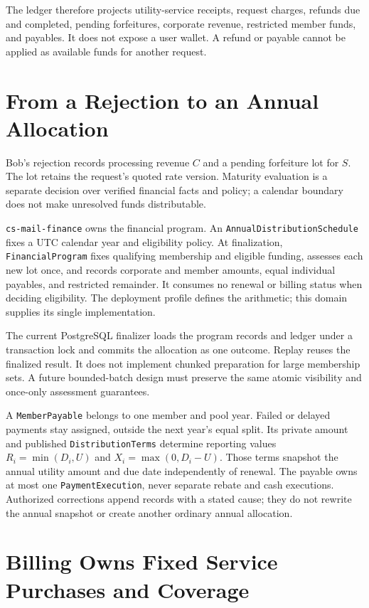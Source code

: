 \documentclass[11pt]{article}
\begin{document}
The ledger therefore projects utility-service receipts, request charges, refunds due and completed,
pending forfeitures, corporate revenue, restricted member funds, and payables.
It does not expose a user wallet. A refund or payable cannot be applied as
available funds for another request.

\section{From a Rejection to an Annual Allocation}

Bob's rejection records processing revenue $C$ and a pending forfeiture lot for
$S$. The lot retains the request's quoted rate version. Maturity evaluation is a
separate decision over verified financial facts and policy; a calendar boundary
does not make unresolved funds distributable.

\texttt{cs-mail-finance} owns the financial program. An
\texttt{AnnualDistributionSchedule} fixes a UTC calendar year and eligibility
policy. At finalization, \texttt{FinancialProgram} fixes qualifying membership
and eligible funding, assesses each new lot once, and records corporate and member
amounts, equal individual payables, and restricted remainder. It consumes no
renewal or billing status when deciding eligibility. The deployment profile
defines the arithmetic; this domain supplies its single implementation.

The current PostgreSQL finalizer loads the program records and ledger under a
transaction lock and commits the allocation as one outcome. Replay reuses the
finalized result. It does not implement chunked preparation for large membership
sets. A future bounded-batch design must preserve the same atomic visibility and
once-only assessment guarantees.

A \texttt{MemberPayable} belongs to one member and pool year. Failed or delayed
payments stay assigned, outside the next year's equal split. Its private amount
and published \texttt{DistributionTerms} determine reporting values
$R_i=\min(D_i,U)$ and $X_i=\max(0,D_i-U)$. Those terms snapshot the annual
utility amount and due date independently of renewal. The payable owns at most
one \texttt{PaymentExecution}, never separate rebate and cash executions.
Authorized corrections append records with a stated cause; they do not rewrite
the annual snapshot or create another ordinary annual allocation.

\section{Billing Owns Fixed Service Purchases and Coverage}
\end{document}
